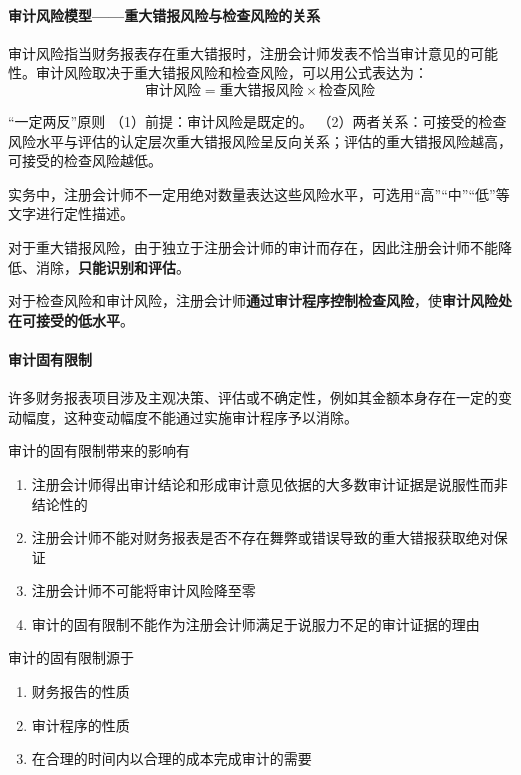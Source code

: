 \documentclass[UTF8,12pt]{ctexart}
\numberwithin{equation}{section} %
\numberwithin{figure}{section}
\numberwithin{table}{section}
\begin{document}
	
	\paragraph{审计风险模型——重大错报风险与检查风险的关系}
	
	审计风险指当财务报表存在重大错报时，注册会计师发表不恰当审计意见的可能性。审计风险取决于重大错报风险和检查风险，可以用公式表达为：
	\begin{equation}
		\text{审计风险} = \text{重大错报风险} \times \text{检查风险}
	\end{equation}
	
	“一定两反”原则
	（1）前提：审计风险是既定的。
	（2）两者关系：可接受的检查风险水平与评估的认定层次重大错报风险呈反向关系；评估的重大错报风险越高，可接受的检查风险越低。
	
	实务中，注册会计师不一定用绝对数量表达这些风险水平，可选用“高”“中”“低”等文字进行定性描述。
	
	对于重大错报风险，由于独立于注册会计师的审计而存在，因此注册会计师不能降低、消除，\textbf{只能识别和评估}。
	
	对于检查风险和审计风险，注册会计师\textbf{通过审计程序控制检查风险}，使\textbf{审计风险处在可接受的低水平}。
	
	\paragraph{审计固有限制}
	许多财务报表项目涉及主观决策、评估或不确定性，例如其金额本身存在一定的变动幅度，这种变动幅度不能通过实施审计程序予以消除。
	
	审计的固有限制带来的影响有
	\begin{enumerate}
		\item 注册会计师得出审计结论和形成审计意见依据的大多数审计证据是说服性而非结论性的
		
		\item 注册会计师不能对财务报表是否不存在舞弊或错误导致的重大错报获取绝对保证
		
		\item 注册会计师不可能将审计风险降至零
		
		\item 审计的固有限制不能作为注册会计师满足于说服力不足的审计证据的理由
	\end{enumerate}
	
	审计的固有限制源于
	\begin{enumerate}
		\item 财务报告的性质
		
		\item 审计程序的性质
		
		\item 在合理的时间内以合理的成本完成审计的需要
	\end{enumerate}
	
\end{document}
